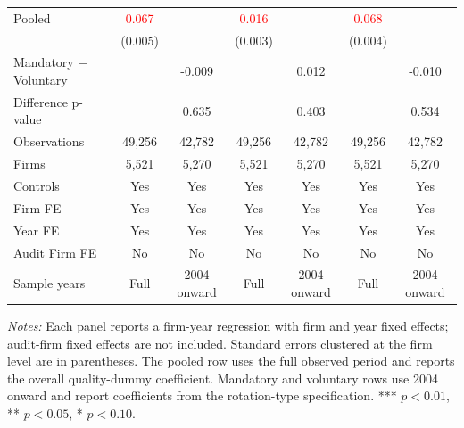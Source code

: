 \begin{table}[htbp]
\begin{threeparttable}
{\begin{tabular}{l cc cc cc}
Pooled & \textcolor{red}{0.067\sym{***}} &  & \textcolor{red}{0.016\sym{***}} &  & \textcolor{red}{0.068\sym{***}} &  \\
 & (0.005) &  & (0.003) &  & (0.004) &  \\
Mandatory $-$ Voluntary &  & -0.009 &  & 0.012 &  & -0.010 \\
Difference p-value &  & 0.635 &  & 0.403 &  & 0.534 \\
Observations & 49,256 & 42,782 & 49,256 & 42,782 & 49,256 & 42,782 \\
Firms & 5,521 & 5,270 & 5,521 & 5,270 & 5,521 & 5,270 \\
\midrule
Controls & Yes & Yes & Yes & Yes & Yes & Yes \\
Firm FE & Yes & Yes & Yes & Yes & Yes & Yes \\
Year FE & Yes & Yes & Yes & Yes & Yes & Yes \\
Audit Firm FE & No & No & No & No & No & No \\
Sample years & Full & 2004 onward & Full & 2004 onward & Full & 2004 onward \\
\bottomrule
\end{tabular}}
\begin{tablenotes}\footnotesize
\item \textit{Notes:} Each panel reports a firm-year regression with firm and year fixed effects; audit-firm fixed effects are not included. Standard errors clustered at the firm level are in parentheses. The pooled row uses the full observed period and reports the overall quality-dummy coefficient. Mandatory and voluntary rows use 2004 onward and report coefficients from the rotation-type specification. *** \(p<0.01\), ** \(p<0.05\), * \(p<0.10\).
\end{tablenotes}
\end{threeparttable}
\end{table}
